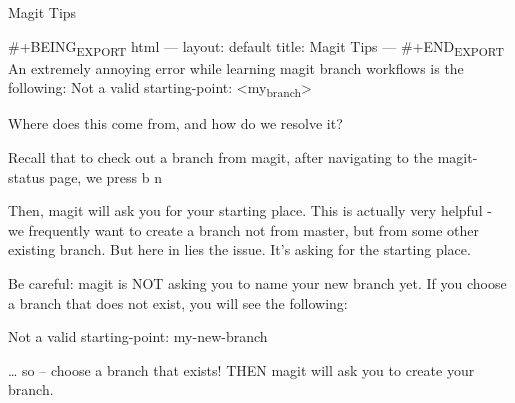 \documentclass[11pt]{scrlttr2}
\date{\today}
\begin{document}
\begin{letter}{%
\mbox{}}

\opening{Magit Tips}

\#+BEING\textsubscript{EXPORT} html
---
layout: default
title: Magit Tips
---
\#+END\textsubscript{EXPORT}
An extremely annoying error while learning magit branch workflows is the following:
Not a valid starting-point: <my\textsubscript{branch}>

Where does this come from, and how do we resolve it? 

Recall that to check out a branch from magit, after navigating to the magit-status page, we press b n

Then, magit will ask you for your starting place. This is actually very helpful - we frequently want to create a branch not from master, but from some other existing branch. But here in lies the issue. It's asking for the starting place. 

Be careful: magit is NOT asking you to name your new branch yet. If you choose a branch that does not exist, you will see the following:

Not a valid starting-point: my-new-branch

\ldots{} so -- choose a branch that exists! THEN magit will ask you to create your branch.
\closing{}




\end{letter}
\end{document}
